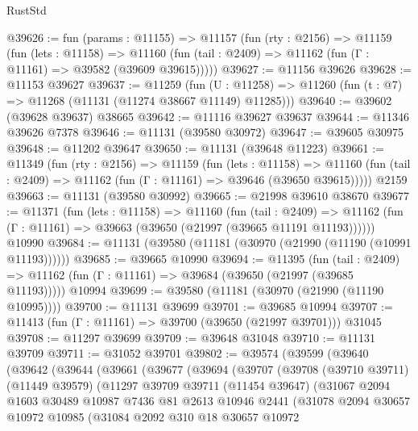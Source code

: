 \begin{lexlean}{RustStd}
\begin{coremodule}
@39626 := fun (params : @11155) =>
  @11157
    (fun (rty : @2156) =>
    @11159
      (fun (lets : @11158) =>
      @11160 (fun (tail : @2409) => @11162 (fun (Γ : @11161) => @39582 (@39609 @39615)))))
@39627 := @11156 @39626
@39628 := @11153 @39627
@39637 := @11259
    (fun (U : @11258) => @11260 (fun (t : @7) => @11268 (@11131 (@11274 @38667 @11149) @11285)))
@39640 := @39602 (@39628 @39637) @38665
@39642 := @11116 @39627 @39637
@39644 := @11346 @39626 @7378
@39646 := @11131 (@39580 @30972)
@39647 := @39605 @30975
@39648 := @11202 @39647
@39650 := @11131 (@39648 @11223)
@39661 := @11349
    (fun (rty : @2156) =>
    @11159
      (fun (lets : @11158) =>
      @11160 (fun (tail : @2409) => @11162 (fun (Γ : @11161) => @39646 (@39650 @39615)))))
    @2159
@39663 := @11131 (@39580 @30992)
@39665 := @21998 @39610 @38670
@39677 := @11371
    (fun (lets : @11158) =>
    @11160
      (fun (tail : @2409) =>
      @11162 (fun (Γ : @11161) => @39663 (@39650 (@21997 (@39665 @11191 @11193))))))
    @10990
@39684 := @11131 (@39580 (@11181 (@30970 (@21990 (@11190 (@10991 @11193))))))
@39685 := @39665 @10990
@39694 := @11395
    (fun (tail : @2409) => @11162 (fun (Γ : @11161) => @39684 (@39650 (@21997 (@39685 @11193)))))
    @10994
@39699 := @39580 (@11181 (@30970 (@21990 (@11190 @10995))))
@39700 := @11131 @39699
@39701 := @39685 @10994
@39707 := @11413 (fun (Γ : @11161) => @39700 (@39650 (@21997 @39701))) @31045
@39708 := @11297 @39699
@39709 := @39648 @31048
@39710 := @11131 @39709
@39711 := @31052 @39701
@39802 := @39574
    (@39599
      (@39640
        (@39642
          (@39644
            (@39661
              (@39677
                (@39694
                  (@39707
                    (@39708
                      (@39710 @39711)
                      (@11449 @39579)
                      (@11297
                        @39709
                        @39711
                        (@11454 @39647)
                        (@31067
                          @2094
                          @1603
                          @30489
                          @10987
                          @7436
                          @81
                          @2613
                          @10946
                          @2441
                          (@31078
                            @2094
                            @30657
                            @10972
                            @10985
                            (@31084
                              @2092
                              @310
                              @18
                              @30657
                              @10972

\end{coremodule}
\end{lexlean}
